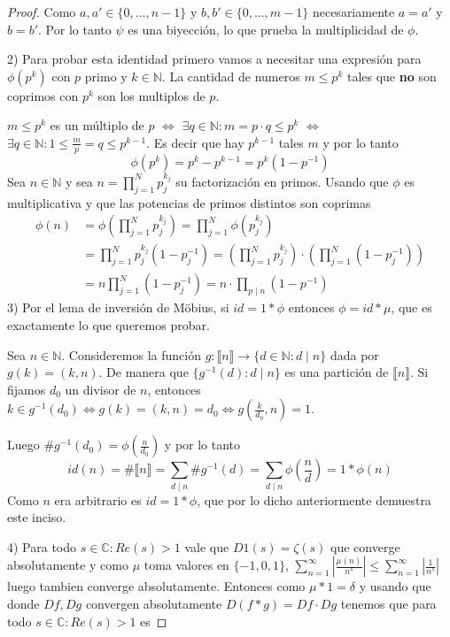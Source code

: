 \documentclass[12pt, a4paper]{article}
\newcommand{\naturales}{\mathbb{N}}
\newcommand{\complejos}{\mathbb{C}}
\newcommand{\hasta}[1]{\llbracket #1 \rrbracket}
\newcommand{\abs}[1]{\left|#1\right|}
\theoremstyle{plain}
\theoremstyle{definition}
\theoremstyle{remark}
\begin{document}
\begin{proof}
Como $a,a' \in \{0,...,n-1\}$ y $b,b' \in \{0,...,m-1\}$ necesariamente $a = a'$ y $ b = b'$.
Por lo tanto $\psi$ es una biyección, lo que prueba la multiplicidad de $\phi$.

2) Para probar esta identidad primero vamos a necesitar una expresión para $\phi(p^k)$ con $p$ primo y $k\in \naturales$.
La cantidad de numeros $m\leq p^k$ tales que \textbf{no} son coprimos con $p^k$ son los multiplos de $p$.

$m \leq p^k$ es un múltiplo de $p$ $\iff$ 
$\exists q \in \naturales : m = p\cdot q \leq p^k$ $\iff$ 
$\exists q \in \naturales : 1 \leq \frac{m}{p} = q \leq p^{k-1}$. Es decir que hay $p^{k-1}$ tales $m$ y por lo tanto
\[
\phi(p^k) = p^k - p^{k-1} = p^k(1-p^{-1})
\]
Sea $n\in \naturales$ y sea $n = \prod_{j=1}^{N}p_j ^{k_j}$ su factorización en primos. Usando que $\phi$ es multiplicativa
y que las potencias de primos distintos son coprimas
\begin{align*}
    \phi(n) &= \phi(\prod_{j=1}^{N}p_j ^{k_j}) = \prod_{j=1}^{N}\phi(p_j ^{k_j}) \\
    &=\prod_{j=1}^{N}p_j^{k_j}(1-p_j^{-1}) = \left(\prod_{j=1}^{N}p_j^{k_j}\right)\cdot\left(\prod_{j=1}^{N}(1-p_j^{-1})\right) \\
    &= n\prod_{j=1}^{N}(1-p_j^{-1}) = n \cdot \prod_{p\mid n}(1-p^{-1})
\end{align*}
3) Por el lema de inversión de Möbius, si $id = 1 * \phi$ entonces $\phi = id * \mu$, que es exactamente lo que queremos
probar. 

Sea $n\in \naturales$. Consideremos la función $g : \hasta{n} \to \{d \in \naturales : d\mid n\}$ dada por $g(k) = (k,n)$. De manera que 
$\{g^{-1}(d): d\mid n\}$ es una partición de $\hasta{n}$. Si fijamos $d_0$ un divisor de $n$, entonces $k\in g^{-1}(d_0)
\iff g(k)= (k,n) = d_0 \iff g(\frac{k}{d_0}, n) = 1$. 

Luego $\#g^{-1}(d_0) = \phi(\frac{n}{d_0})$ y por lo tanto
\[
id(n) = \#\hasta{n} = \sum_{d\mid n}\#g^{-1}(d) = \sum_{d\mid n}\phi(\frac{n}{d}) = 1 * \phi(n)
\]
Como $n$ era arbitrario es $id = 1 * \phi$, que por lo dicho anteriormente demuestra este inciso.

4) Para todo $s\in\complejos : Re(s)>1$ vale que
  $D1(s) = \zeta(s)$ que converge absolutamente y como $\mu$ toma valores en $\{-1,0,1\}$, 
  $\sum_{n=1}^{\infty}\abs{\frac{\mu(n)}{n^{s}}} \leq \sum_{n=1}^{\infty}\abs{\frac{1}{n^{s}}}$ luego tambien converge absolutamente.
  Entonces como $\mu * 1 = \delta$ y usando que donde $Df,Dg$ convergen absolutamente $D(f*g) = Df \cdot Dg$ tenemos que para
  todo $s\in\complejos : Re(s)>1$ es


\end{proof}
\end{document}

